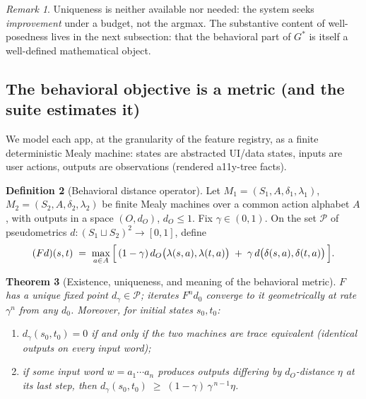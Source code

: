 \documentclass[11pt]{article}
\theoremstyle{plain}
\newtheorem{theorem}{Theorem}[section]
\theoremstyle{definition}
\newtheorem{definition}[theorem]{Definition}
\theoremstyle{remark}
\newtheorem{remark}[theorem]{Remark}
\newcommand{\cP}{\mathcal{P}}
\begin{document}
\begin{remark}
Uniqueness is neither available nor needed: the system seeks
\emph{improvement} under a budget, not the argmax. The substantive content of
well-posedness lives in the next subsection: that the behavioral part of
$G^\ast$ is itself a well-defined mathematical object.
\end{remark}

\subsection{The behavioral objective is a metric (and the suite estimates it)}

We model each app, at the granularity of the feature registry, as a finite
deterministic Mealy machine: states are abstracted UI/data states, inputs are
user actions, outputs are observations (rendered a11y-tree facts).

\begin{definition}[Behavioral distance operator]\label{def:bisimop}
Let $M_1 = (S_1, A, \delta_1, \lambda_1)$, $M_2 = (S_2, A, \delta_2,
\lambda_2)$ be finite Mealy machines over a common action alphabet $A$, with
outputs in a space $(O, d_O)$, $d_O \le 1$. Fix $\gamma \in (0,1)$. On the
set $\cP$ of pseudometrics $d : (S_1 \sqcup S_2)^2 \to [0,1]$, define
\[
  (F d)(s, t) \;=\; \max_{a \in A}\,
    \Bigl[\, (1-\gamma)\, d_O\bigl(\lambda(s,a), \lambda(t,a)\bigr)
      \;+\; \gamma\, d\bigl(\delta(s,a), \delta(t,a)\bigr) \,\Bigr].
\]
\end{definition}

\begin{theorem}[Existence, uniqueness, and meaning of the behavioral metric]
\label{thm:bisim}
$F$ has a unique fixed point $d_\gamma \in \cP$; iterates $F^n d_0$ converge
to it geometrically at rate $\gamma^n$ from any $d_0$. Moreover, for initial
states $s_0, t_0$:
\begin{enumerate}[label=(\alph*),leftmargin=2.5em]
  \item $d_\gamma(s_0, t_0) = 0$ if and only if the two machines are trace
        equivalent (identical outputs on every input word);
  \item if some input word $w = a_1 \cdots a_n$ produces outputs differing by
        $d_O$-distance $\eta$ at its last step, then
        $d_\gamma(s_0, t_0) \;\ge\; (1-\gamma)\,\gamma^{\,n-1}\eta$.
\end{enumerate}
\end{theorem}
\end{document}
